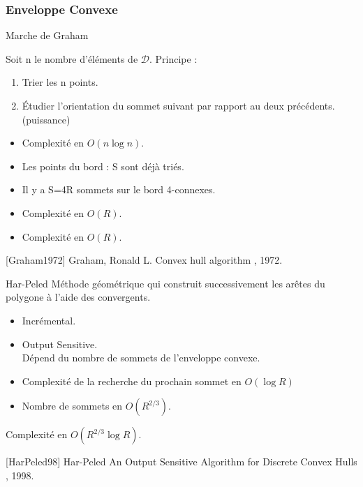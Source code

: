 \begin{frame}
\frametitle{Enveloppe Convexe}
\begin{block}{Marche de Graham}
  {
  Soit n le nombre d'éléments de $\mathcal{D}$.
  Principe :
  \begin{enumerate}
    \item Trier les n points.
    \item Étudier l'orientation du sommet suivant par rapport au deux précédents. (puissance)
  \end{enumerate}

  \begin{itemize}
    \item Complexité en $O(n \log n)$.
    \item Les points du bord : S sont déjà triés. 
    \item Il y a S=4R sommets sur le bord 4-connexes.
    \item Complexité en $O(R)$.
  \end{itemize}
 }
  {
  \begin{itemize}
    \item Complexité en $O(R)$.
  \end{itemize}
 }  
\end{block}

{
  \scriptsize
  \begin{thebibliography}{alpha}
    [Graham1972] Graham, Ronald L.
    \newblock Convex hull algorithm
    , 1972. 
  \end{thebibliography}
}
{
  \begin{block}{Har-Peled}  
    Méthode géométrique qui construit successivement les arêtes du polygone à l’aide des convergents.
    \begin{itemize}
      \item Incrémental.
      \item Output Sensitive.\\
      Dépend du nombre de sommets de l’enveloppe convexe.
    \end{itemize}  

    \begin{itemize}
      \item Complexité de la recherche du prochain sommet en $O(\log R)$
      \item Nombre de sommets en $O(R^{2/3})$. 
    \end{itemize}
    Complexité en $O(R^{2/3} \log R)$.
  \end{block}

  \scriptsize
  \begin{thebibliography}{alpha}
    [HarPeled98] Har-Peled
    \newblock An Output Sensitive Algorithm for Discrete Convex Hulls
    , 1998.
    \end{thebibliography}
}
\end{frame}



